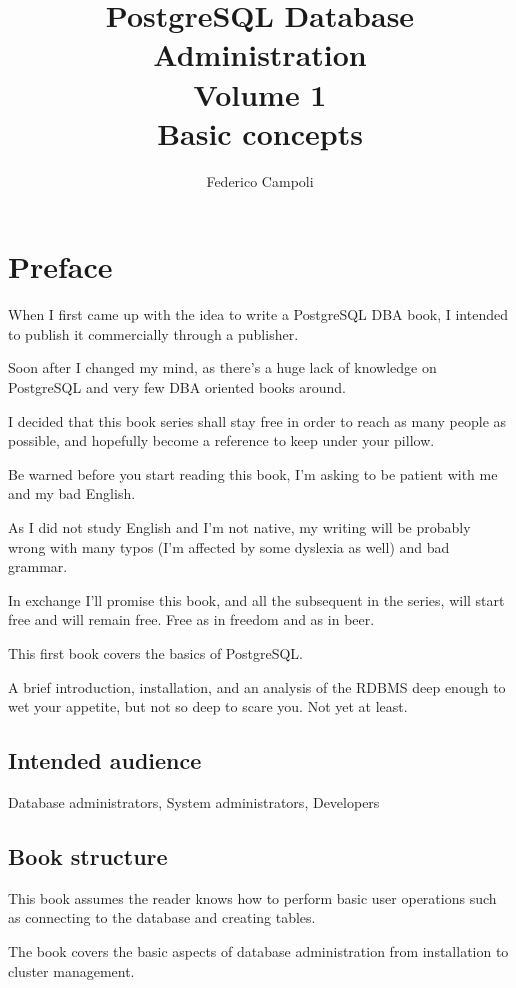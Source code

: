 \documentclass[oneside]{book}
\author{Federico Campoli}
\title{PostgreSQL Database Administration \\ Volume 1 \\ Basic concepts}
\begin{document}

\maketitle

\newpage{}



\tableofcontents{}

\chapter*{Preface}
When I first came up with the idea to write a PostgreSQL DBA book, I intended
to publish it commercially through a publisher.

Soon after I changed my mind, as there's a huge lack of knowledge on
PostgreSQL and very few DBA oriented books around.

I decided that this book series shall stay free in order to reach as many people
as possible, and hopefully become a reference to keep under your pillow.

Be warned before you start reading this book, I'm asking to be patient with me
and my bad English.

As I did not study English and I'm not native, my writing will be probably wrong
with many typos (I'm affected by some dyslexia as well) and bad grammar.

In exchange I'll promise this book, and all the subsequent in the series, will
start free and will remain free. Free as in freedom and as in beer.

This first book covers the basics of PostgreSQL.

A brief introduction, installation, and an analysis of the RDBMS deep enough to
wet your appetite, but not so deep to scare you. Not yet at least.




\section*{Intended audience}
Database administrators, System administrators, Developers

\section*{Book structure}
This book assumes the reader knows how to perform basic user operations such as
connecting to the database and creating tables.

The book covers the basic aspects of database administration from installation
to cluster management.
\end{document}
